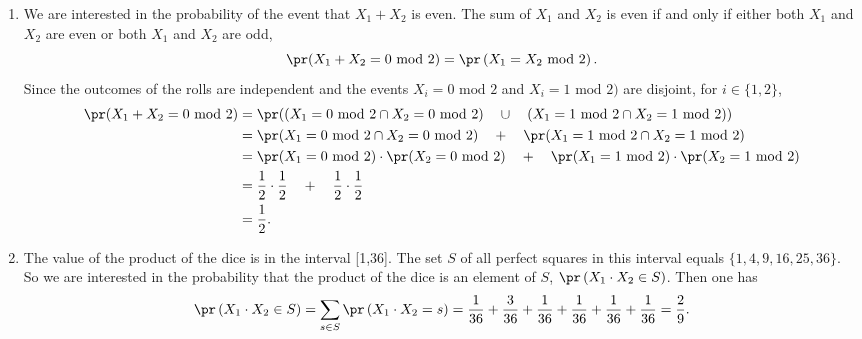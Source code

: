 \begin{enumerate}
  \item[(c)] We are interested in the probability of the event that $X_1 + X_2$
    is even. The sum of $X_1$ and $X_2$ is even if and only if either both $X_1$
    and $X_2$ are even or both $X_1$ and $X_2$ are odd,
    \[
      \pr(X_1 + X_2 = 0 \text{  mod }2) = \pr\left(X_1 = X_2 \text{  mod }2\right).
    \]
    Since the outcomes of the rolls are independent and  the events $X_i = 0 \text{  mod }2$ and $X_i = 1 \text{  mod }2)$ are disjoint, for $i \in \{ 1,2 \}$,
    \begin{align*}
      \pr(X_1 + X_2 = 0 \text{  mod }2)
         &= \pr((X_1 = 0 \text{  mod }2 \cap X_2 = 0 \text{  mod }2)  \quad \cup \quad (X_1 = 1 \text{  mod }2 \cap X_2 = 1 \text{  mod }2)) \\
         &= \pr(X_1 = 0 \text{  mod }2 \cap X_2 = 0 \text{  mod }2)     \quad  +   \quad \pr(X_1 = 1 \text{  mod }2 \cap X_2 = 1 \text{  mod }2) \\
         &= \pr(X_1 = 0 \text{  mod }2) \cdot \pr(X_2 = 0 \text{  mod }2)\quad  +  \quad \pr(X_1 = 1 \text{  mod }2) \cdot \pr(X_2 = 1 \text{  mod }2) \\
         &= \frac{1}{2} \cdot \frac{1}{2} \quad  +   \quad \frac{1}{2} \cdot \frac{1}{2} \\
         &= \frac{1}{2}.
  \end{align*}

  \item[(d)] The value of the product of the dice is in the interval [1,36]. The
    set $S$ of all perfect squares in this interval equals $\{ 1, 4, 9, 16, 25, 36 \}$.
    So we are interested in the probability that the product of the dice is an
    element of $S$, $\pr\left(X_1 \cdot X_2 \in S\right)$. Then one has
    \[
      \pr\left(X_1 \cdot X_2 \in S\right)
        = \sum_{s \in S}\pr\left(X_1 \cdot X_2 = s\right)
        = \frac{1}{36} + \frac{3}{36} +  \frac{1}{36} +  \frac{1}{36} +  \frac{1}{36} +  \frac{1}{36}\\
        = \frac{2}{9}.
    \]
\end{enumerate}


